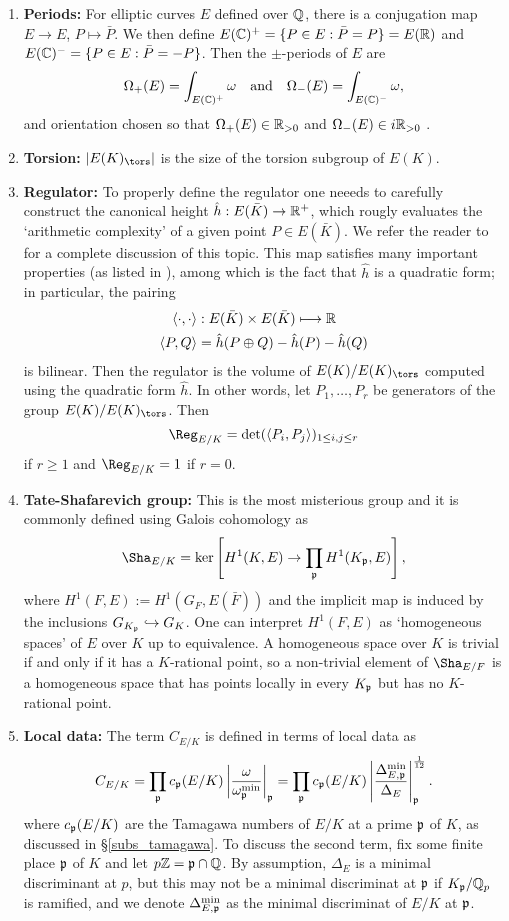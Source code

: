 \begin{enumerate}
    \item \textbf{Periods: } For elliptic curves $E$ defined over $\mathbb{Q}$, there is a conjugation map $E\to E$, $P\mapsto\bar{P}$. We then define $E(\mathbb{C})^+=\{P\in E:\bar{P}=P\}=E(\mathbb{R})$ and $E(\mathbb{C})^-=\{P\in E:\bar{P}=-P\}$. Then the $\pm$-periods of $E$ are 
    $$\Omega_+(E)=\int_{E(\mathbb{C})^+}\omega \quad\text{and}\quad\Omega_-(E)=\int_{E(\mathbb{C})^-}\omega,$$
    and orientation chosen so that $\Omega_+(E)\in\mathbb{R}_{>0}$ and $\Omega_-(E)\in i\mathbb{R}_{>0}$ .
    \item \textbf{Torsion:} $|E(K)_{\tors}|$ is the size of the torsion subgroup of $E(K)$.
    \item \textbf{Regulator:} To properly define the regulator one neeeds to carefully construct the canonical height $\hat{h}:E(\bar{K})\rightarrow\mathbb{R}^+$, which rougly evaluates the `arithmetic complexity' of a given point $P\in E(\bar{K})$. We refer the reader to \cite[Chapter VIII: \S4, \S5, \S6 and \S9]{S1} for a complete discussion of this topic. This map satisfies many important properties (as listed in \cite[Chapter VIII, Theorem 9.3]{S1}), among which is the fact that $\hat{h}$ is a quadratic form; in particular, the pairing
    \begin{align*}
        \langle\cdot,\cdot\rangle&:E(\bar{K})\times E(\bar{K})\longmapsto\mathbb{R}\\
        \langle P,Q\rangle&=\hat{h}(P\oplus Q)-\hat{h}(P)-\hat{h}(Q)
    \end{align*}
    is bilinear. Then the regulator is the volume of $E(K)/E(K)_{\tors}$ computed using the quadratic form $\hat{h}$. In other words, let $P_1,\ldots,P_r$ be generators of the group $E(K)/E(K)_{\tors}$. Then $$\Reg_{E/K}=\det(\langle P_i,P_j\rangle)_{1\leq i,j\leq r}$$
    if $r\geq1$ and $\Reg_{E/K}=1$ if $r=0$.
    \item \textbf{Tate-Shafarevich group:} This is the most misterious group and it is commonly defined using Galois cohomology as
    $$\Sha_{E/K}=\ker\left[H^1(K,E)\rightarrow\prod_{\pp}H^1(K_\pp,E)\right],$$
    where $H^1(F,E):=H^1(G_F,E(\bar{F}))$ and the implicit map is induced by the inclusions $G_{K_{\mathfrak{p}}}\hookrightarrow G_K$. One can interpret $H^1(F,E)$ as `homogeneous spaces' of $E$ over $K$ up to equivalence. A homogeneous space over $K$ is trivial if and only if it has a $K$-rational point, so a non-trivial element of $\Sha_{E/F}$ is a homogeneous space that has points locally in every $K_{\mathfrak{p}}$ but has no $K$-rational point.

    \item \textbf{Local data:} The term $C_{E/K}$ is defined in terms of local data as 
    $$C_{E/K}=\prod_{\mathfrak{p}}c_{\mathfrak{p}}(E/K)\left|\frac{\omega}{\omega_{\mathfrak{p}}^{\min}}\right|_{\mathfrak{p}}=\prod_{\mathfrak{p}}c_{\mathfrak{p}}(E/K)\left|\frac{\Delta_{E,\mathfrak{p}}^{\min}}{\Delta_E}\right|_{\mathfrak{p}}^{\frac{1}{12}}.$$
    where $c_{\mathfrak{p}}(E/K)$ are the Tamagawa numbers of $E/K$ at a prime $\mathfrak{p}$ of $K$, as discussed in \S\ref*{subs_tamagawa}. To discuss the second term, fix some finite place $\mathfrak{p}$ of $K$ and let $p\mathbb{Z}=\mathfrak{p}\cap\mathbb{Q}$. By assumption, $\Delta_E$ is a minimal discriminant at $p$, but this may not be a minimal discriminat at $\mathfrak{p}$ if $K_{\mathfrak{p}}/\mathbb{Q}_p$ is ramified, and we denote $\Delta_{E,\mathfrak{p}}^{\min}$ as the minimal discriminat of $E/K$ at $\mathfrak{p}$. 
    

\end{enumerate}
